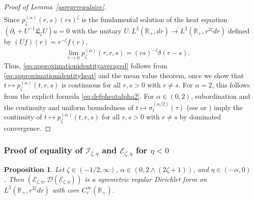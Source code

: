 \documentclass[12pt,reqno]{amsart}
\newtheorem{proposition}[theorem]{Proposition}
\theoremstyle{definition}
\theoremstyle{remark}
\numberwithin{equation}{section}
\newcommand{\1}{\mathbbm{1}}
\newcommand{\D}{\mathcal{D}}
\newcommand{\R}{\mathbb{R}}
\def\ce{\mathcal{E}}
\def\ci{\mathcal{I}}
\def\fl{\mathfrak{L}}
\begin{document}
\begin{proof}[Proof of Lemma~\ref{gsreprrepulsive}]
\begin{align}
  \end{align}
  Since $p_\zeta^{(\alpha)}(r,s)(rs)^{\zeta}$ is the fundamental solution of the heat equation $(\partial_t+U^{-1}\fl_\zeta U)u=0$ with the unitary $U:L^2(\R_+,dr)\to L^2(\R_+,r^{2\zeta}dr)$ defined by $(Uf)(r)=r^{-\zeta}f(r)$,
  \begin{align}
    \label{eq:approximationidentityheat}
    \lim_{\tau\to0}p_\zeta^{(\alpha)}(\tau,r,s) = (rs)^{-\zeta} \delta(r-s).
  \end{align}
  Thus, \eqref{eq:approximationidentityaveraged} follows from \eqref{eq:approximationidentityheat} and the mean value theorem, once we show that $t\mapsto p_\zeta^{(\alpha)}(t,r,s)$ is continuous for all $r,s>0$ with $r\neq s$. For $\alpha=2$, this follows from the explicit formula \eqref{eq:defpheatalpha2}. For $\alpha\in(0,2)$, subordination and the continuity and uniform boundedness of $t\mapsto \sigma_t^{(\alpha/2)}(\tau)$ (see \cite{Pollard1946} or \cite[Proposition~B.1]{BogdanMerz2024}) imply the continuity of $t\mapsto p_\zeta^{(\alpha)}(t,r,s)$ for all $r,s>0$ with $r\neq s$ by dominated convergence.
\end{proof}


\subsubsection{Proof of equality of $\ci_{\zeta,\eta}$ and $\ce_{\zeta,\eta}$ for $\eta<0$}


\begin{proposition}
  \label{jakprop317}
  Let $\zeta\in(-1/2,\infty)$, $\alpha\in(0,2\wedge(2\zeta+1))$, and $\eta\in(-\alpha,0)$.
  Then $(\ce_{\zeta,\eta},\D(\ce_{\zeta,\eta}))$ is a symmetric regular Dirichlet form on $L^2(\R_+,r^{2\zeta}dr)$ with core $C_c^\infty(\R_+)$.
\end{proposition}
\end{document}
